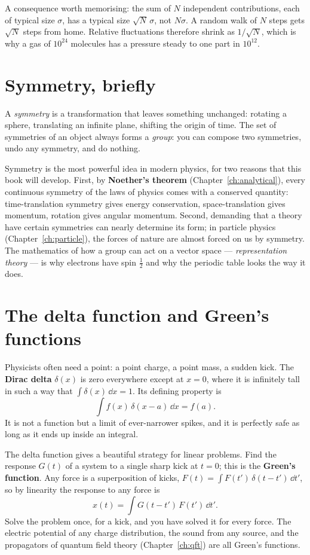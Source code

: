 A consequence worth memorising: the sum of $N$ independent contributions, each of typical size $\sigma$, has a typical size $\sqrt N\,\sigma$, not $N\sigma$. A random walk of $N$ steps gets $\sqrt N$ steps from home. Relative fluctuations therefore shrink as $1/\sqrt{N}$, which is why a gas of $10^{24}$ molecules has a pressure steady to one part in $10^{12}$.

\section{Symmetry, briefly}

A \emph{symmetry} is a transformation that leaves something unchanged: rotating a sphere, translating an infinite plane, shifting the origin of time. The set of symmetries of an object always forms a \emph{group}: you can compose two symmetries, undo any symmetry, and do nothing.

Symmetry is the most powerful idea in modern physics, for two reasons that this book will develop. First, by \textbf{Noether's theorem} (Chapter~\ref{ch:analytical}), every continuous symmetry of the laws of physics comes with a conserved quantity: time-translation symmetry gives energy conservation, space-translation gives momentum, rotation gives angular momentum. Second, demanding that a theory have certain symmetries can nearly determine its form; in particle physics (Chapter~\ref{ch:particle}), the forces of nature are almost forced on us by symmetry. The mathematics of how a group can act on a vector space --- \emph{representation theory} --- is why electrons have spin $\tfrac12$ and why the periodic table looks the way it does.

\section{The delta function and Green's functions}

Physicists often need a point: a point charge, a point mass, a sudden kick. The \textbf{Dirac delta} $\delta(x)$ is zero everywhere except at $x=0$, where it is infinitely tall in such a way that $\int \delta(x)\,\dd x = 1$. Its defining property is
\[
  \int f(x)\,\delta(x-a)\,\dd x = f(a).
\]
It is not a function but a limit of ever-narrower spikes, and it is perfectly safe as long as it ends up inside an integral.

The delta function gives a beautiful strategy for linear problems. Find the response $G(t)$ of a system to a single sharp kick at $t=0$; this is the \textbf{Green's function}. Any force is a superposition of kicks, $F(t) = \int F(t')\,\delta(t-t')\,\dd t'$, so by linearity the response to any force is
\[
  x(t) = \int G(t-t')\,F(t')\,\dd t'.
\]
Solve the problem once, for a kick, and you have solved it for every force. The electric potential of any charge distribution, the sound from any source, and the propagators of quantum field theory (Chapter~\ref{ch:qft}) are all Green's functions.

